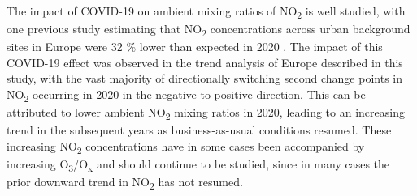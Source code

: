 \documentclass[journal abbreviation, manuscript]{copernicus}
\begin{document}
The impact of COVID-19 on ambient mixing ratios of NO\textsubscript{2} is well studied, with one previous study estimating that NO\textsubscript{2} concentrations across urban background sites in Europe were 32 \% lower than expected in 2020 \citep{acp-21-4169-2021}. The impact of this COVID-19 effect was observed in the trend analysis of Europe described in this study, with the vast majority of directionally switching second change points in NO\textsubscript{2} occurring in 2020 in the negative to positive direction. This can be attributed to lower ambient NO\textsubscript{2} mixing ratios in 2020, leading to an increasing trend in the subsequent years as business-as-usual conditions resumed.  These increasing NO\textsubscript{2} concentrations have in some cases been accompanied by increasing O\textsubscript{3}/O\textsubscript{x} and should continue to be studied, since in many cases the prior downward trend in NO\textsubscript{2} has not resumed.


\clearpage













\end{document}
